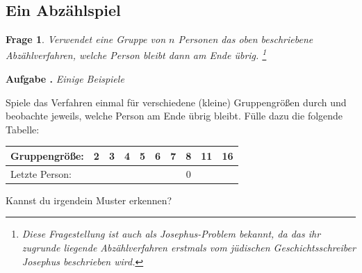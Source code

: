\documentclass[a4paper,ngerman,12pt]{scrartcl}
\theoremstyle{definition}
\theoremstyle{plain}
\newtheorem{frage}[defn]{Frage}
\theoremstyle{remark}
\newlength{\aufgabenskip}
\newcounter{aufgabennummer}
\newenvironment{aufgabe}[1]{
	\addtocounter{aufgabennummer}{1}
	\textbf{Aufgabe \theaufgabennummer.} \emph{#1} \par
}{\vspace{\aufgabenskip}}
\begin{document}
\subsection{Ein Abzählspiel}



\begin{frage}
	Verwendet eine Gruppe von $n$ Personen das oben beschriebene Abzählverfahren, welche Person bleibt dann am Ende übrig.
	\footnote{Diese Fragestellung ist auch als Josephus-Problem bekannt, da das ihr zugrunde liegende Abzählverfahren erstmals vom jüdischen Geschichtsschreiber Josephus beschrieben wird.}
\end{frage}

\begin{aufgabe}{Einige Beispiele}
	Spiele das Verfahren einmal für verschiedene (kleine) Gruppengrößen durch und beobachte jeweils, welche Person am Ende übrig bleibt. Fülle dazu die folgende Tabelle:
	\begin{center}
		\renewcommand{\arraystretch}{2}
		\begin{tabular}{l||c|c|c|c|c|c|c|c|c}
			Gruppengröße:	& 2	& 3 & 4 & 5 & 6 & 7 & 8 & 11 & 16 \\\hline
			Letzte Person:	&   &   &   &   &   &   & 0 &    &    
		\end{tabular}
	\end{center}
	Kannst du irgendein Muster erkennen? 
\end{aufgabe}


%
%
%
\end{document}
